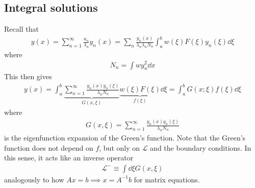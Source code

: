 \subsection{Integral solutions}
Recall that
\begin{align*}
    y(x) = \sum_{n=1}^\infty \frac{a_n}{\lambda_n} y_n(x) = \sum_n \frac{y_n(x)}{\lambda_n \lambda_n N_n} \int_a^b w(\xi) F(\xi) y_n(\xi) \dd{\xi}
\end{align*}
where
\begin{align*}
    N_n = \int w y_n^2 \dd{x}
\end{align*}
This then gives
\begin{align*}
    y(x) = \int_a^b \underbrace{\sum_{n=1}^\infty \frac{y_n(x) y_n(\xi)}{\lambda_n N_n}}_{G(x,\xi)} \underbrace{w(\xi) F(\xi)}_{f(\xi)} \dd{\xi} = \int_a^b G(x;\xi) f(\xi) \dd{\xi}
\end{align*}
where
\begin{align*}
    G(x,\xi) = \sum_{n=1}^\infty \frac{y_n(x) y_n(\xi)}{\lambda_n N_n}
\end{align*}
is the eigenfunction expansion of the Green's function.
Note that the Green's function does not depend on $f$, but only on $\mathcal L$ and the boundary conditions.
In this sense, it acts like an inverse operator
\begin{align*}
    \mathcal L^- \equiv \int \dd{\xi} G(x,\xi)
\end{align*}
analogously to how $Ax = b \implies x = A^{-1} b$ for matrix equations.

